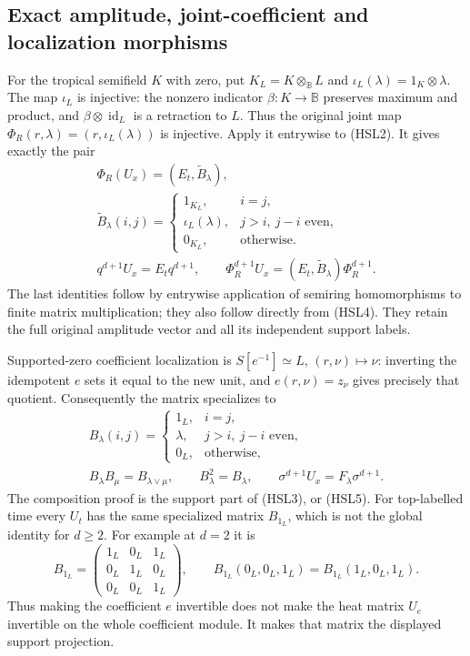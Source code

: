 \subsection{Exact amplitude, joint-coefficient and localization morphisms}

For the tropical semifield $K$ with zero, put
$K_L=K\otimes_{\mathbb B}L$ and
$\iota_L(\lambda)=1_K\otimes\lambda$.
The map $\iota_L$ is injective: the nonzero indicator
$\beta:K\to\mathbb B$ preserves maximum and product, and
$\beta\otimes\operatorname{id}_L$ is a retraction to $L$.
Thus the original joint map
$\Phi_R(r,\lambda)=(r,\iota_L(\lambda))$ is injective.
Apply it entrywise to (HSL2). It gives exactly the pair
\begin{equation}\tag{HSL12}
 \begin{gathered}
 \Phi_R(U_x)=(E_t,\widetilde B_\lambda),\\
 \widetilde B_\lambda(i,j)=
 \begin{cases}
  1_{K_L},&i=j,\\
  \iota_L(\lambda),&j>i,\ j-i\text{ even},\\
  0_{K_L},&\text{otherwise}.
 \end{cases}\\
 q^{d+1}U_x=E_tq^{d+1},\qquad
 \Phi_R^{d+1}U_x=(E_t,\widetilde B_\lambda)\Phi_R^{d+1}.
 \end{gathered}
\end{equation}
The last identities follow by entrywise application of semiring
homomorphisms to finite matrix multiplication; they also follow
directly from (HSL4). They retain the full original amplitude
vector and all its independent support labels.

Supported-zero coefficient localization is
$S[e^{-1}]\simeq L$, $(r,\nu)\mapsto\nu$:
inverting the idempotent $e$ sets it equal to the new unit,
and $e(r,\nu)=z_\nu$ gives precisely that quotient.
Consequently the matrix specializes to
\begin{equation}\tag{HSL13}
 \begin{gathered}
 B_\lambda(i,j)=
 \begin{cases}
  1_L,&i=j,\\
  \lambda,&j>i,\ j-i\text{ even},\\
  0_L,&\text{otherwise},
 \end{cases}\\
 B_\lambda B_\mu=B_{\lambda\vee\mu},\qquad
 B_\lambda^2=B_\lambda,\qquad
 \sigma^{d+1}U_x=F_\lambda\sigma^{d+1}.
 \end{gathered}
\end{equation}
The composition proof is the support part of (HSL3), or (HSL5).
For top-labelled time every $U_t$ has the same specialized
matrix $B_{1_L}$, which is not the global identity for $d\ge2$.
For example at $d=2$ it is
\[
 B_{1_L}=
 \begin{pmatrix}1_L&0_L&1_L\\0_L&1_L&0_L\\0_L&0_L&1_L\end{pmatrix},
 \qquad
 B_{1_L}(0_L,0_L,1_L)=B_{1_L}(1_L,0_L,1_L).
\]
Thus making the coefficient $e$ invertible does not make the
heat matrix $U_e$ invertible on the whole coefficient module.
It makes that matrix the displayed support projection.

